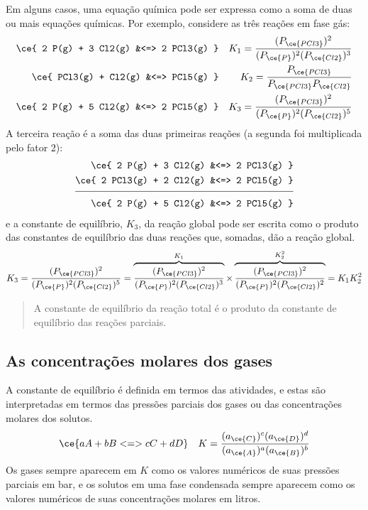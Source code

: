 Em alguns casos, uma equação química pode ser expressa como a soma de duas ou mais equações químicas. Por exemplo, considere as três reações em fase
gás: \[
\begin{aligned}
    \ce{ 2 P(g) + 3 Cl2(g) &<=> 2 PCl3(g) } 
        && K_1 = \dfrac{ (P_{\ce{PCl3}})^2 }{ (P_{\ce{P}})^2 (P_{\ce{Cl2}})^3 } \\
    \ce{ PCl3(g) + Cl2(g) &<=> PCl5(g) } 
        && K_2 = \dfrac{ P_{\ce{PCl3}} }{ P_{\ce{PCl3}} P_{\ce{Cl2}} } \\
    \ce{ 2 P(g) + 5 Cl2(g) &<=> 2 PCl5(g) } 
        && K_3 = \dfrac{ (P_{\ce{PCl3}})^2 }{ (P_{\ce{P}})^2 (P_{\ce{Cl2}})^5 }
\end{aligned}
\] A terceira reação é a soma das duas primeiras reações (a segunda foi multiplicada pelo fator 2): \[
\begin{aligned}
    \ce{ 2 P(g) + 3 Cl2(g) &<=> 2 PCl3(g) } \\
    \ce{ 2 PCl3(g) + 2 Cl2(g) &<=> 2 PCl5(g) } \\[1ex] 
    \hline \\[-2ex]
    \ce{ 2 P(g) + 5 Cl2(g) &<=> 2 PCl5(g) }
\end{aligned}
\] e a constante de equilíbrio, \(K_3\), da reação global pode ser escrita como o produto das constantes de equilíbrio das duas reações que, somadas,
dão a reação global. \[
    K_3 = \dfrac{ (P_{\ce{PCl3}})^2 }{ (P_{\ce{P}})^2 (P_{\ce{Cl2}})^5 }
        = \overbrace{ \dfrac{ (P_{\ce{PCl3}})^2 }{ (P_{\ce{P}})^2 (P_{\ce{Cl2}})^3 } }^{ K_1 } 
          \times
          \overbrace{ \dfrac{ (P_{\ce{PCl3}})^2 }{ (P_{\ce{P}})^2 (P_{\ce{Cl2}})^2 } }^{ K_2^2 }
        = K_1 K_2^2
\]

\begin{quote}
A constante de equilíbrio da reação total é o produto da constante de equilíbrio das reações parciais.
\end{quote}

\subsection{As concentrações molares dos gases}

A constante de equilíbrio é definida em termos das atividades, e estas são interpretadas em termos das pressões parciais dos gases ou das
concentrações molares dos solutos. \[
    \ce{a A + b B <=> c C + d D } 
        \quad K = \dfrac{ (a_{\ce{C}})^c (a_{\ce{D}})^d }{ (a_{\ce{A}})^a (a_{\ce{B}})^b }
\] Os gases sempre aparecem em \(K\) como os valores numéricos de suas pressões parciais em bar, e os solutos em uma fase condensada sempre aparecem
como os valores numéricos de suas concentrações molares em litros.

